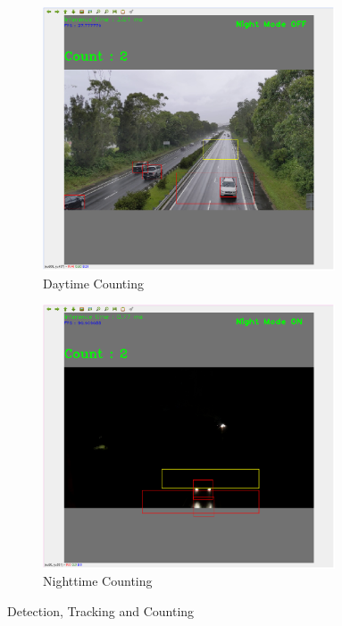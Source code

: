 \documentclass[12pt,a4paper,fleqn]{report}
\begin{document}
\begin{figure}[htbp]
    \begin{subfigure}[htbp]{0.5\textwidth}
        \includegraphics[width=0.95\textwidth]{figures/daytime-detection.png}
    \caption{Daytime Counting}
    \label{fig:daytime-detection}
    \end{subfigure}
    \begin{subfigure}[htbp]{0.5\textwidth}
        \includegraphics[width=0.95\textwidth]{figures/nightime-detection.png}
    \caption{Nighttime Counting}
    \label{fig:nighttime-detection}
    \end{subfigure}
    \caption{Detection, Tracking and Counting}
    \label{fig:detection-tracking-counting}
\end{figure}
\end{document}
